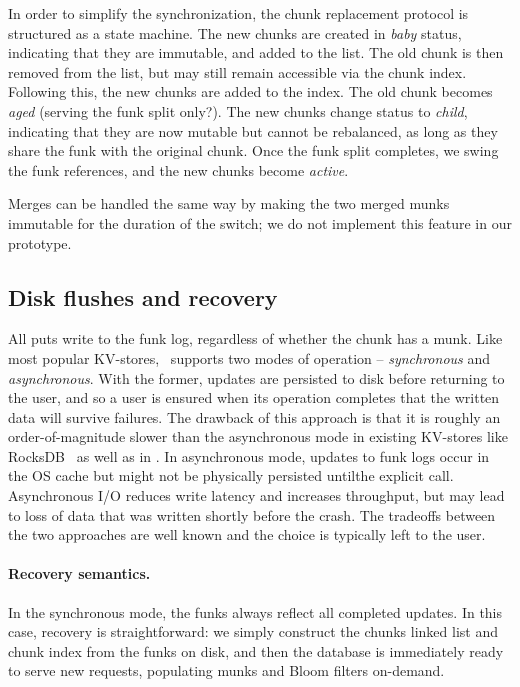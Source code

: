 {In order to simplify the synchronization, the chunk replacement protocol is structured as a state machine. The new chunks are created in 
\emph{baby} status, indicating that they are immutable, and added to the list. The old chunk is then removed from the list, but may still 
remain accessible via the chunk index. Following this, the new chunks are added to the index. The old chunk becomes \emph{aged}
(serving the funk split only?). The new chunks change status to \emph{child}, indicating that they are now mutable but cannot be 
rebalanced, as long as they share the funk with the original chunk. Once the funk split completes, we swing the funk references, 
and the new chunks become \emph{active}.
}

Merges can be handled the same way by making the two merged munks immutable for the duration of the switch; 
we do not implement this feature in our prototype.

\subsection{Disk flushes and recovery}
\label{ssec:flush-recovery}

All puts write to the funk log, regardless of whether the chunk has a munk. Like most popular KV-stores, \sys\ supports 
two modes of operation -- \emph{synchronous} and \emph{asynchronous}. With the former,  updates are persisted to disk 
before returning to the user, and so a user is ensured when its operation completes that the written data will survive failures. 
The drawback of this approach is that it is roughly an order-of-magnitude slower than the asynchronous mode in existing KV-stores 
like RocksDB~\cite{RocksDB} as well as in \sys. In asynchronous mode, updates to funk logs occur in the OS cache but might 
not be physically persisted untilthe explicit  call.  Asynchronous I/O reduces write latency and increases throughput, but 
may lead to loss of data that was written shortly before the crash. The tradeoffs between the two approaches are 
well known and the choice is typically left to the user.

\paragraph{Recovery semantics.}
In the synchronous mode, 
the funks always reflect all completed updates. In this case, recovery is straightforward: we simply construct
the chunks linked list and chunk index from the funks on disk, and then the database is immediately ready to serve new requests, populating munks and Bloom filters on-demand.  

